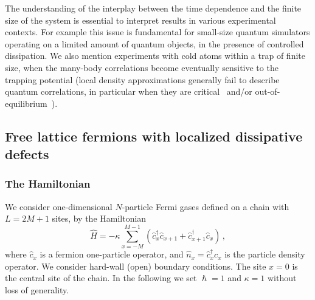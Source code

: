   
  The understanding of the interplay between the time dependence and the
  finite size of the system is essential to interpret results in various
  experimental contexts. For example this issue is fundamental for
  small-size quantum simulators operating on a limited amount of quantum
  objects, in the presence of controlled dissipation. We also mention
  experiments with cold atoms within a trap of finite size, when the
  many-body correlations become eventually sensitive to the trapping
  potential (local density approximations generally fail to describe
  quantum correlations, in particular when they are
  critical~\cite{CTV-13} and/or out-of-equilibrium~\cite{RV-21-rev}).
  
  
  \subsection{Free lattice fermions  with localized dissipative defects}
  \label{modeldiss}
  
  \subsubsection{The Hamiltonian}
  \label{model}
  
  We consider one-dimensional $N$-particle Fermi gases defined on a
  chain with $L=2M+1$ sites, by the Hamiltonian
  \begin{equation}
    \hat H =
    - \kappa \sum _{x=-M}^{M-1} 
    (\hat c_{x}^\dagger \hat c_{x+1} +  \hat c_{x+1}^\dagger \hat c_{x})\,,
    \label{Hfree}
  \end{equation}
  where $\hat c_x$ is a fermion one-particle operator, and $\hat n_x =
  \hat c_x^\dagger c_x$ is the particle density operator.  We consider
  hard-wall (open) boundary conditions.  The site $x=0$ is the central
  site of the chain.  In the following we set $\hslash=1$ and $\kappa=1$
  without loss of generality.
  
